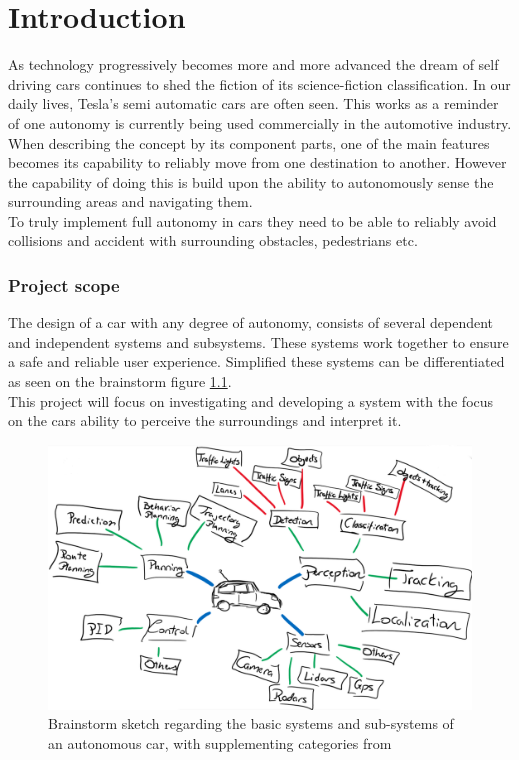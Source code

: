 \chapter{Introduction}\label{ch:Introduction}
As technology progressively becomes more and more advanced the dream of self driving cars continues to shed the fiction of its science-fiction classification. 
In our daily lives, Tesla's semi automatic cars are often seen. This works as a reminder of one autonomy is currently being used commercially in the automotive industry. \\
When describing the concept by its component parts, one of the main features becomes its capability to reliably move from one destination to another. However the capability of doing this is build upon the ability to autonomously sense the surrounding areas and navigating them. \\ To truly implement full autonomy in cars they need to be able to reliably avoid collisions and accident with surrounding obstacles, pedestrians etc.
\\
\color{blue}
\subsection{Project scope}
The design of a car with any degree of autonomy, consists of several dependent and independent systems and subsystems. These systems work together to ensure a safe and reliable user experience. Simplified these systems can be differentiated as seen on the brainstorm figure \ref{fig:AutoCarSysPic}.\\
This project will focus on investigating and developing a system with the focus on the cars ability to perceive the surroundings and interpret it.

\begin{figure}[H]
 \centering
  \includegraphics[width=\textwidth]{Figures/ConAnalysis/General/AutoCarSystems2.png}
  \caption{Brainstorm sketch regarding the basic systems and sub-systems of an autonomous car, with supplementing categories  from\cite{AutoCarSys:online}}
  \label{fig:AutoCarSysPic}
\end{figure}

